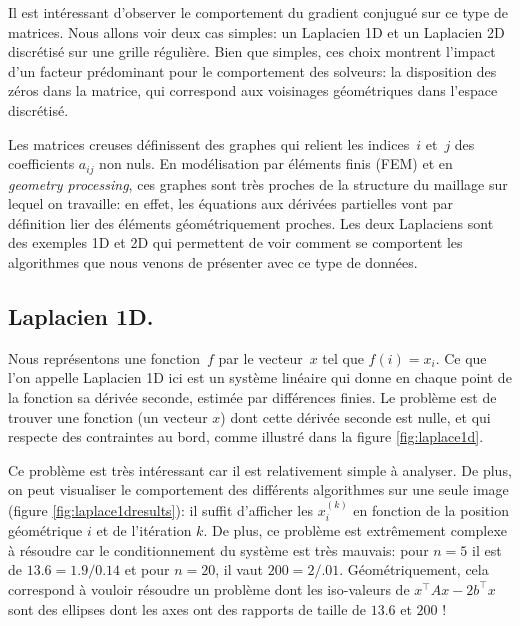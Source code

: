 \documentclass[notitlepage,oneside]{book}
\begin{document}
Il est intéressant d'observer le comportement du gradient conjugué sur
ce type de matrices. Nous allons voir deux cas simples: un Laplacien
1D et un Laplacien 2D discrétisé sur une grille régulière. Bien que
simples, ces choix montrent l'impact d'un facteur prédominant pour le
comportement des solveurs: la disposition des zéros dans la matrice,
qui correspond aux voisinages géométriques dans l'espace discrétisé.
	
Les matrices creuses définissent des graphes qui relient les indices~$i$ et~$j$
des coefficients $a_{ij}$ non nuls. En modélisation par éléments finis (FEM)
et en {\it geometry processing}, ces graphes sont très proches de la structure
du maillage sur lequel on travaille: en effet, les équations aux
dérivées partielles vont par définition lier des éléments
géométriquement proches. Les deux Laplaciens sont des exemples 1D et
2D qui permettent de voir comment se comportent les algorithmes que nous
venons de présenter avec ce type de données.
	
		
\subsection{Laplacien 1D.}
	
Nous représentons une fonction~$f$ par le vecteur~$x$ tel que $f(i) =
x_i$. Ce que l'on appelle Laplacien 1D ici est un système linéaire qui
donne en chaque point de la fonction sa dérivée seconde, estimée par
différences finies. Le problème est de trouver une fonction (un
vecteur $x$) dont cette dérivée seconde est nulle, et qui respecte des
contraintes au bord, comme illustré dans la figure
\ref{fig:laplace1d}.
	
Ce problème est très intéressant car il est relativement simple à
analyser. De plus, on peut visualiser le comportement des différents
algorithmes sur une seule image (figure \ref{fig:laplace1dresults}):
il suffit d'afficher les $x_i^{(k)}$ en fonction de la position
géométrique $i$ et de l'itération $k$. De plus, ce problème est
extrêmement complexe à résoudre car le conditionnement du système est
très mauvais: pour $n=5$ il est de $13.6= 1.9 / 0.14$ et pour $n=20$,
il vaut $200 = 2/.01$. Géométriquement, cela correspond à vouloir
résoudre un problème dont les iso-valeurs de $x^\top Ax-2b^\top x$
sont des ellipses dont les axes ont des rapports de taille de $13.6$
et $200$ !
	
\end{document}
